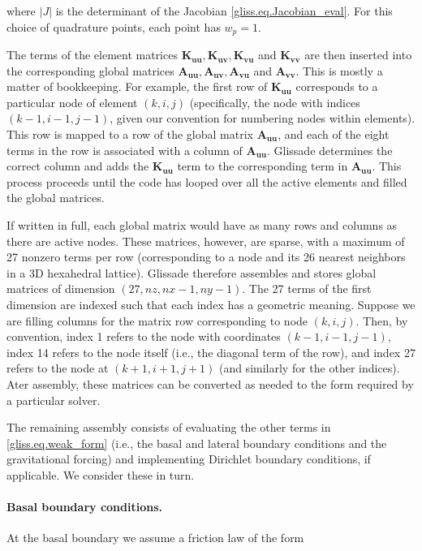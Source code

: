 \noindent
where $|J|$ is the determinant of the Jacobian \eqref{gliss.eq.Jacobian_eval}. For this choice of quadrature points,
each point has $w_p = 1$.

The terms of the element matrices $\mathbf{K_{uu}}, \mathbf{K_{uv}}, \mathbf{K_{vu}}$ and $\mathbf{K_{vv}}$
are then inserted into the corresponding global matrices $\mathbf{A_{uu}}, \mathbf{A_{uv}}, \mathbf{A_{vu}}$ and $\mathbf{A_{vv}}$.
This is mostly a matter of bookkeeping.
For example, the first row of $\mathbf{K_{uu}}$ corresponds to a particular node of element $(k,i,j)$
(specifically, the node with indices $(k-1,i-1,j-1)$, given our convention for numbering nodes within elements).  
This row is mapped to a row of the global matrix $\mathbf{A_{uu}}$, 
and each of the eight terms in the row is associated with a column of $\mathbf{A_{uu}}$.  
Glissade determines the correct column
and adds the $\mathbf{K_{uu}}$ term to the corresponding term in $\mathbf{A_{uu}}$.  This process proceeds
until the code has looped over all the active elements and filled the global matrices.

If written in full, each global matrix would have as many rows and columns as there are active nodes.
These matrices, however, are sparse, with a maximum of 27 nonzero terms per row (corresponding to
a node and its 26 nearest neighbors in a 3D hexahedral lattice).
Glissade therefore assembles and stores global matrices of dimension $(27,nz,nx-1,ny-1)$.
The 27 terms of the first dimension are indexed such that each index has a geometric meaning.
Suppose we are filling columns for the matrix row corresponding to node $(k,i,j)$. 
Then, by convention, index 1 refers to the node with coordinates $(k-1,i-1,j-1)$, index 14 refers to the
node itself (i.e., the diagonal term of the row), and index 27 refers to the node at $(k+1,i+1,j+1)$
(and similarly for the other indices).
Ater assembly, these matrices can be converted as needed to the form required by a particular solver.

The remaining assembly consists of evaluating the other terms in \eqref{gliss.eq.weak_form}
(i.e., the basal and lateral boundary conditions and the gravitational forcing) and implementing
Dirichlet boundary conditions, if applicable. We consider these in turn.

\paragraph{Basal boundary conditions.}

At the basal boundary we assume a friction law of the form 

